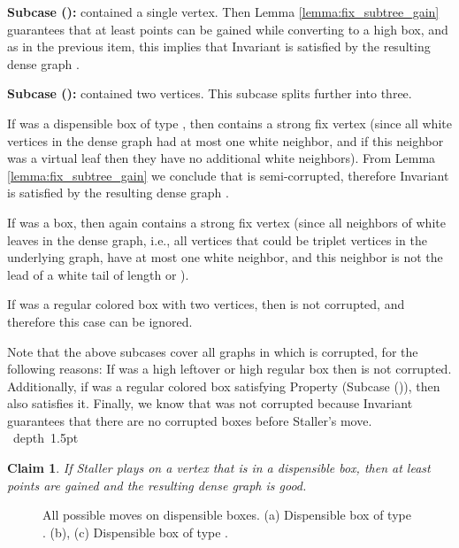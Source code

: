 \documentclass[11pt]{article}
\def\blackslug{\hbox{\hskip 1pt \vrule width 4pt height 8pt
    depth 1.5pt \hskip 1pt}}
\def\QED{\quad\blackslug\lower 8.5pt\null\par}
\def\dnsitem{\vspace{-7pt}\item}
\newtheorem{claim}[theorem]{Claim}
\theoremstyle{definition}
\begin{document}
\smallskip
\par\noindent
{\bf Subcase ():}
 contained a single  vertex. Then Lemma \ref{lemma:fix_subtree_gain} guarantees that at least  points can be gained while converting  to a high box, and as in the previous item, this implies that Invariant  is satisfied by the resulting dense graph .

\smallskip
\par\noindent
{\bf Subcase ():}
 contained two  vertices.
This subcase splits further into three.
\begin{description}
	\dnsitem[Subcase ():] If  was a dispensible box of type , then  contains a strong fix vertex 
	(since all white vertices in the dense graph had at most one white neighbor, and if this neighbor was a virtual leaf then they have no additional white neighbors). 
	From Lemma \ref{lemma:fix_subtree_gain} we conclude that  is semi-corrupted, therefore Invariant  is satisfied by the resulting dense graph .
	\dnsitem[Subcase ():] If  was a  box, then again  contains a strong fix vertex (since all neighbors of white leaves in the dense graph, i.e., all vertices that could be triplet vertices in the underlying graph, have at most one white neighbor, and this neighbor is not the lead of a white tail of length  or ). 
	\dnsitem[Subcase ():]If  was a regular colored box with two  vertices, then  is not corrupted, and therefore this case can be ignored.
\end{description}
Note that the above subcases cover all graphs in which  is corrupted, for the following reasons:
If  was a high leftover or high regular box then  is not corrupted.
Additionally, if  was a regular colored box satisfying Property  (Subcase ()), then  also satisfies it.
Finally, we know that  was not corrupted because Invariant  guarantees that there are no corrupted boxes before Staller's move.
\QED

\begin{claim}
\label{claim:staller_dispensible}
If Staller plays on  a vertex  that is in a dispensible box, then at least  points are gained and the resulting dense graph  is good.
\end{claim}
\begin{figure}[thbp]
  \caption{\sf All possible moves on dispensible boxes.
		(a) Dispensible box of type .
		(b), (c) Dispensible box of type .}
  \medskip
  \centering
  \label{fig:dispensible_staller}
\end{figure}
\end{document}
